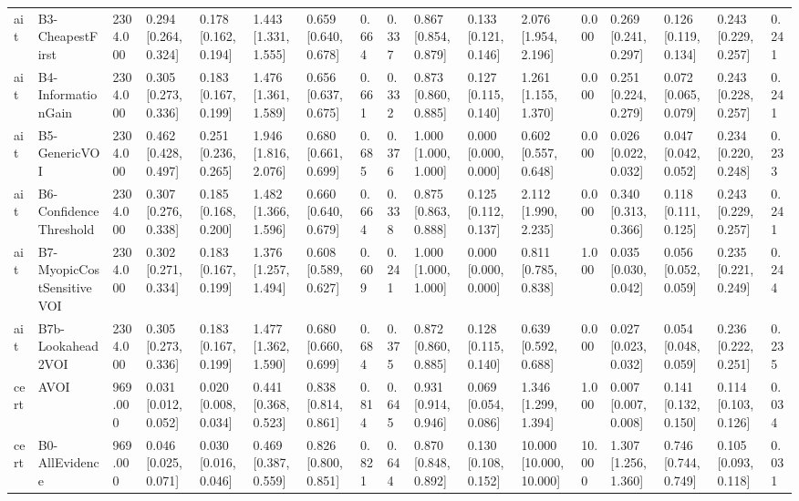 \begin{table}[!ht]
{\begin{tabular}{lllllllllllllllll}
ait & B3-CheapestFirst & 2304.000 & 0.294 [0.264, 0.324] & 0.178 [0.162, 0.194] & 1.443 [1.331, 1.555] & 0.659 [0.640, 0.678] & 0.664 & 0.337 & 0.867 [0.854, 0.879] & 0.133 [0.121, 0.146] & 2.076 [1.954, 2.196] & 0.000 & 0.269 [0.241, 0.297] & 0.126 [0.119, 0.134] & 0.243 [0.229, 0.257] & 0.241 \\
ait & B4-InformationGain & 2304.000 & 0.305 [0.273, 0.336] & 0.183 [0.167, 0.199] & 1.476 [1.361, 1.589] & 0.656 [0.637, 0.675] & 0.661 & 0.332 & 0.873 [0.860, 0.885] & 0.127 [0.115, 0.140] & 1.261 [1.155, 1.370] & 0.000 & 0.251 [0.224, 0.279] & 0.072 [0.065, 0.079] & 0.243 [0.228, 0.257] & 0.241 \\
ait & B5-GenericVOI & 2304.000 & 0.462 [0.428, 0.497] & 0.251 [0.236, 0.265] & 1.946 [1.816, 2.076] & 0.680 [0.661, 0.699] & 0.685 & 0.376 & 1.000 [1.000, 1.000] & 0.000 [0.000, 0.000] & 0.602 [0.557, 0.648] & 0.000 & 0.026 [0.022, 0.032] & 0.047 [0.042, 0.052] & 0.234 [0.220, 0.248] & 0.233 \\
ait & B6-ConfidenceThreshold & 2304.000 & 0.307 [0.276, 0.338] & 0.185 [0.168, 0.200] & 1.482 [1.366, 1.596] & 0.660 [0.640, 0.679] & 0.664 & 0.338 & 0.875 [0.863, 0.888] & 0.125 [0.112, 0.137] & 2.112 [1.990, 2.235] & 0.000 & 0.340 [0.313, 0.366] & 0.118 [0.111, 0.125] & 0.243 [0.229, 0.257] & 0.241 \\
ait & B7-MyopicCostSensitiveVOI & 2304.000 & 0.302 [0.271, 0.334] & 0.183 [0.167, 0.199] & 1.376 [1.257, 1.494] & 0.608 [0.589, 0.627] & 0.609 & 0.241 & 1.000 [1.000, 1.000] & 0.000 [0.000, 0.000] & 0.811 [0.785, 0.838] & 1.000 & 0.035 [0.030, 0.042] & 0.056 [0.052, 0.059] & 0.235 [0.221, 0.249] & 0.244 \\
ait & B7b-Lookahead2VOI & 2304.000 & 0.305 [0.273, 0.336] & 0.183 [0.167, 0.199] & 1.477 [1.362, 1.590] & 0.680 [0.660, 0.699] & 0.684 & 0.375 & 0.872 [0.860, 0.885] & 0.128 [0.115, 0.140] & 0.639 [0.592, 0.688] & 0.000 & 0.027 [0.023, 0.032] & 0.054 [0.048, 0.059] & 0.236 [0.222, 0.251] & 0.235 \\
cert & AVOI & 969.000 & 0.031 [0.012, 0.052] & 0.020 [0.008, 0.034] & 0.441 [0.368, 0.523] & 0.838 [0.814, 0.861] & 0.814 & 0.645 & 0.931 [0.914, 0.946] & 0.069 [0.054, 0.086] & 1.346 [1.299, 1.394] & 1.000 & 0.007 [0.007, 0.008] & 0.141 [0.132, 0.150] & 0.114 [0.103, 0.126] & 0.034 \\
cert & B0-AllEvidence & 969.000 & 0.046 [0.025, 0.071] & 0.030 [0.016, 0.046] & 0.469 [0.387, 0.559] & 0.826 [0.800, 0.851] & 0.821 & 0.644 & 0.870 [0.848, 0.892] & 0.130 [0.108, 0.152] & 10.000 [10.000, 10.000] & 10.000 & 1.307 [1.256, 1.360] & 0.746 [0.744, 0.749] & 0.105 [0.093, 0.118] & 0.031 \\

\end{tabular}}
\end{table}
